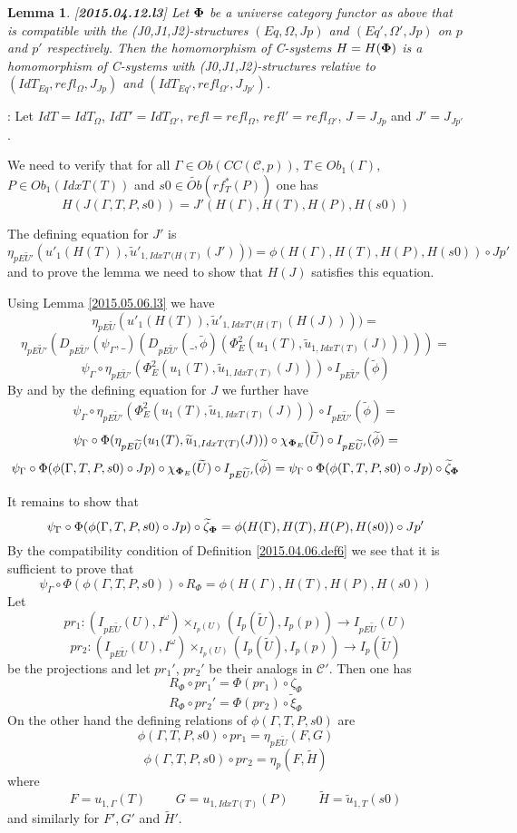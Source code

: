 \documentclass[12pt]{article}
\newenvironment{myproof}{{\bf Proof}:}{\vskip 5mm }
\newtheorem{lemma}[proposition]{Lemma}
\newcommand{\llabel}[1]{\label{#1}[{\bf #1}]}
\newcommand{\sr}{\rightarrow}
\newcommand{\wt}{\widetilde}
\newcommand{\spc}{{\,\,\,\,\,\,\,}}
\begin{document}
\begin{lemma}
\llabel{2015.04.12.l3}
Let ${\bf\Phi}$ be a universe category functor as above that is compatible with the (J0,J1,J2)-structures $(Eq,\Omega,Jp)$ and $(Eq',\Omega',Jp)$ on $p$ and $p'$ respectively. Then the homomorphism of C-systems $H=H({\bf\Phi})$ is a homomorphism of C-systems with (J0,J1,J2)-structures relative to $(IdT_{Eq},refl_{\Omega},J_{Jp})$ and $(IdT_{Eq'},refl_{\Omega'},J_{Jp'})$.
\end{lemma}
%
\begin{myproof}
Let $IdT=IdT_{\Omega}$, $IdT'=IdT_{\Omega'}$, $refl=refl_{\Omega}$, $refl'=refl_{\Omega'}$, $J=J_{Jp}$ and $J'=J_{Jp'}$.

We need to verify that for all $\Gamma\in Ob(CC({\mathcal C},p))$, $T\in Ob_1(\Gamma)$, $P\in Ob_1(IdxT(T))$ and $s0\in \wt{Ob}(rf^*_T(P))$ one has
%
$$H(J(\Gamma,T,P,s0))=J'(H(\Gamma),H(T),H(P),H(s0))$$
%

The defining equation for $J'$ is
%
$$\eta_{pE\wt{U}'}(u'_1(H(T)),\wt{u}'_{1,{IdxT'(H(T)}}(J')))=\phi(H(\Gamma),H(T),H(P),H(s0))\circ Jp'$$
%
and to prove the lemma we need to show that $H(J)$ satisfies  this equation.

Using Lemma \ref{2015.05.06.l3} we have
%
$$\eta_{pE\wt{U}}(u'_1(H(T)),\wt{u}'_{1,{IdxT'(H(T)}}(H(J))))=$$$$\eta_{pE\wt{U}'}(D_{pE\wt{U}'}(\psi_{\Gamma},\_)(D_{pE\wt{U}'}(\_,\wt{\phi})(\Phi_E^2(u_1(T),\wt{u}_{1,IdxT(T)}(J)))))=$$
$$\psi_{\Gamma}\circ \eta_{pE\wt{U}'}(\Phi_E^2(u_1(T),\wt{u}_{1,IdxT(T)}(J)))\circ I_{pE\wt{U}'}(\wt{\phi})$$
%
By \cite[Lemma 5.8]{fromunivwithPi} and by the defining equation for $J$ we further have
%
$$\psi_{\Gamma}\circ \eta_{pE\wt{U}'}(\Phi_E^2(u_1(T),\wt{u}_{1,IdxT(T)}(J)))\circ I_{pE\wt{U}'}(\wt{\phi})=$$$$\psi_{\Gamma}\circ \Phi(\eta_{pE\wt{U}}(u_1(T),\wt{u}_{1,IdxT(T)}(J)))\circ \chi_{{\bf\Phi}_E}(\wt{U})\circ I_{pE\wt{U}'}(\wt{\phi})=$$
$$\psi_{\Gamma}\circ \Phi(\phi(\Gamma,T,P,s0)\circ Jp)\circ \chi_{{\bf\Phi}_E}(\wt{U})\circ I_{pE\wt{U}'}(\wt{\phi})=\psi_{\Gamma}\circ \Phi(\phi(\Gamma,T,P,s0)\circ Jp)\circ \wt{\zeta}_{\bf\Phi}$$
%

It remains to show that
%
$$\psi_{\Gamma}\circ \Phi(\phi(\Gamma,T,P,s0)\circ Jp)\circ \wt{\zeta}_{\bf\Phi}=\phi(H(\Gamma),H(T),H(P),H(s0))\circ Jp'$$
%
By the compatibility condition of Definition \ref{2015.04.06.def6} we see that it is sufficient to prove that 
%
$$\psi_{\Gamma}\circ \Phi(\phi(\Gamma,T,P,s0))\circ R_{\Phi} = \phi(H(\Gamma),H(T),H(P),H(s0))$$
%
Let 
%
$$pr_1:(I_{pE\wt{U}}(U),I^{\omega})\times_{I_{p}(U)}(I_{p}(\wt{U}),I_p(p))\sr I_{pE\wt{U}}(U)$$
$$pr_2:(I_{pE\wt{U}}(U),I^{\omega})\times_{I_{p}(U)}(I_{p}(\wt{U}),I_p(p))\sr I_{p}(\wt{U})$$
%
be the projections and let $pr_1'$, $pr_2'$ be their analogs in $\mathcal C'$. Then one has
%
$$R_{\Phi}\circ pr_1'=\Phi(pr_1)\circ \zeta_{\Phi}$$
$$R_{\Phi}\circ pr_2'=\Phi(pr_2)\circ \wt{\xi}_{\Phi}$$
%
On the other hand the defining relations of $\phi(\Gamma,T,P,s0)$ are
%
$$\phi(\Gamma,T,P,s0)\circ pr_1=\eta_{pE\wt{U}}(F,G)$$
$$\phi(\Gamma,T,P,s0)\circ pr_2=\eta_p(F,\wt{H})$$
%
where 
%
$$F=u_{1,\Gamma}(T)\spc\spc G=u_{1,IdxT(T)}(P)\spc\spc \wt{H}=\wt{u}_{1,T}(s0)$$
%
and similarly for $F',G'$ and $\wt{H}'$.


\end{myproof}
\end{document}
